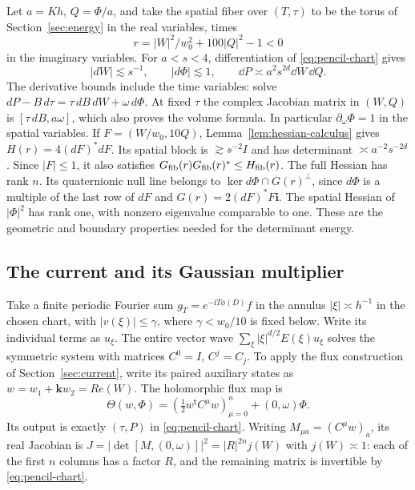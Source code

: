 Let $a=Kh$, $Q=\Phi/a$, and take the spatial fiber over $(T,\tau)$ to be
the torus of Section~\ref{sec:energy} in the real variables, times
\[
 r=|W|^2/w_0^2+100|Q|^2-1<0
\]
in the imaginary variables. For $a<s<4$, differentiation of
\eqref{eq:pencil-chart} gives
\begin{equation}\label{eq:pencil-scales}
 |dW|\lesssim s^{-1},\qquad |d\Phi|\lesssim1,\qquad
 \dd P\asymp a^2s^{2d}\dd W\,\dd Q .
\end{equation}
The derivative bounds include the time variables: solve
$dP-B\,d\tau=\tau\, dB\,dW+\omega\,d\Phi$. At fixed $\tau$ the complex
Jacobian matrix in $(W,Q)$ is $[\tau\, dB,a\omega]$, which also proves
the volume formula. In particular $\partial_\omega\Phi=1$ in the spatial
variables. If $F=(W/w_0,10Q)$, Lemma~\ref{lem:hessian-calculus} gives
$H(r)=4(dF)^*dF$. Its spatial block is $\gtrsim s^{-2}I$ and has
determinant $\asymp a^{-2}s^{-2d}$. Since $|F|\le1$, it also satisfies
$G_{\rm fib}(r)G_{\rm fib}(r)^*\le H_{\rm fib}(r)$. The full Hessian has rank $n$.
Its quaternionic null line belongs to $\ker d\Phi\cap G(r)^\perp$,
since $d\Phi$ is a multiple of the last row of $dF$ and
$G(r)=2(dF)^*F\mathbf i$. The spatial Hessian of $|\Phi|^2$ has rank one,
with nonzero eigenvalue comparable to one. These are the geometric and
boundary properties needed for the determinant energy.

\subsection{The current and its Gaussian multiplier}

Take a finite periodic Fourier sum $g_T=e^{-\mathrm iT\phi(D)}f$ in the
annulus $|\xi|\asymp h^{-1}$ in the chosen chart, with $|v(\xi)|\le\gamma$, where
$\gamma<w_0/10$ is fixed below. Write its individual terms as $u_\xi$.
The entire vector wave $\sum_\xi |\xi|^{d/2}E(\xi)u_\xi$ solves the
symmetric system with matrices $C^0=I$, $C^j=C_j$. To apply the flux
construction of Section~\ref{sec:current}, write its paired auxiliary
states as $w=w_1+\mathbf k w_2=R e(W)$. The holomorphic flux map is
\[
 \Theta(w,\Phi)=
 \left(\tfrac12w^{\mathsf t} C^\mu w\right)_{\mu=0}^n+(0,\omega)\Phi .
\]
Its output is exactly $(\tau,P)$ in \eqref{eq:pencil-chart}.
Writing $M_{\mu a}=(C^\mu w)_a$, its real Jacobian is
$J=|\det[M,(0,\omega)]|^2=|R|^{2n}j(W)$ with $j(W)\asymp1$:
each of the first $n$ columns has a factor $R$, and the remaining
matrix is invertible by \eqref{eq:pencil-chart}.

